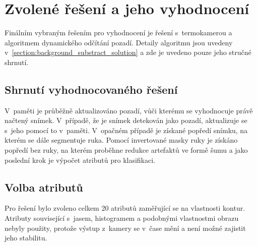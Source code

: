 \chapter{Zvolené řešení a jeho vyhodnocení}\label{chapter:choosen_solution}
Finálním vybraným řešením pro vyhodnocení je řešení s~termokamerou a algoritmem dynamického odčítání pozadí. Detaily algoritmu jsou uvedeny v~\ref{section:background_substract_solution} a zde je uvedeno pouze jeho stručné shrnutí. 

\section{Shrnutí vyhodnocovaného řešení}
V~paměti je průběžně aktualizováno pozadí, vůči kterému se vyhodnocuje právě načtený snímek. V~případě, že je snímek detekován jako pozadí, aktualizuje se s~jeho pomocí to v~paměti. V~opačném případě je získané popředí snímku, na kterém se dále segmentuje ruka. Pomocí invertované masky ruky je získáno popředí bez ruky, na kterém proběhne redukce artefaktů ve formě šumu a jako poslední krok je výpočet atributů pro klasifikaci.

\section{Volba atributů}\label{section:attributes}
Pro řešení bylo zvoleno celkem 20 atributů zaměřující se na vlastnosti kontur. Atributy související s~jasem, histogramem a podobnými vlastnostmi obrazu nebyly použity, protože výstup z~kamery se v~čase mění a není možné zajistit jeho stabilitu.


